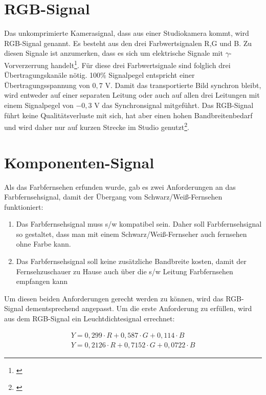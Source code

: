 \section{RGB-Signal}
\label{sec_rgbsignal}
Das unkomprimierte Kamerasignal, dass aus einer Studiokamera kommt, wird RGB-Signal genannt. Es besteht aus den drei Farbwertsignalen R,G und B. Zu diesen Signale ist anzumerken, dass es sich um elektrische Signale mit $\gamma$-Vorverzerrung handelt\footnote{\cite[82]{schmidt}}. Für diese drei Farbwertsignale sind folglich drei Übertragungskanäle nötig. 100\% Signalpegel entspricht einer Übertragungsspannung von $0,7$ V. Damit das transportierte Bild synchron bleibt, wird entweder auf einer separaten Leitung oder auch auf allen drei Leitungen mit einem Signalpegel von $-0,3$ V das Synchronsignal mitgeführt. Das RGB-Signal führt keine Qualitätsverluste mit sich, hat aber einen hohen Bandbreitenbedarf und wird daher nur auf kurzen Strecke im Studio genutzt\footnote{\cite[83]{schmidt}}.

\section{Komponenten-Signal}
\label{sec_ycrcb}
Als das Farbfernsehen erfunden wurde, gab es zwei Anforderungen an das Farbfernsehsignal, damit der Übergang vom Schwarz/Weiß-Fernsehen funktioniert: 
\begin{enumerate}
\item Das Farbfernsehsignal muss s/w kompatibel sein. Daher soll Farbfernsehsignal so gestaltet, dass man mit einem Schwarz/Weiß-Fernseher auch fernsehen ohne Farbe kann.
\item Das Farbfernsehsignal soll keine zusätzliche Bandbreite kosten, damit der Fernsehzuschauer zu Hause auch über die s/w Leitung Farbfernsehen empfangen kann
\end{enumerate}

Um diesen beiden Anforderungen gerecht werden zu können, wird das RGB-Signal dementsprechend angepasst. Um die erste Anforderung zu erfüllen, wird aus dem RGB-Signal ein Leuchtdichtesignal errechnet:

\begin{eqnarray}\label{gl_ycrcb1}
	Y = 0,299 \cdot R + 0,587 \cdot G + 0,114 \cdot B\\
	Y = 0,2126 \cdot R + 0,7152 \cdot G + 0,0722 \cdot B
\end{eqnarray}

